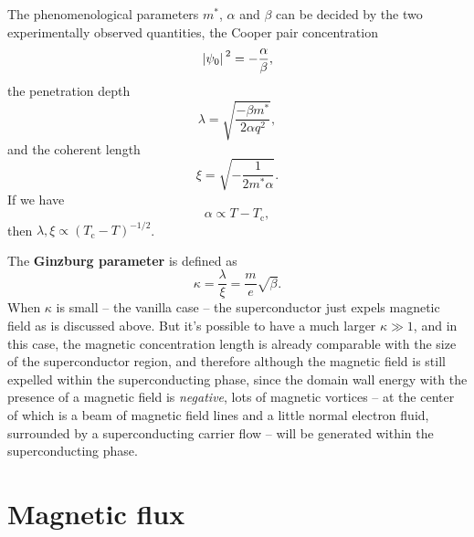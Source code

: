 \documentclass[hyperref, a4paper]{article}
\newcommand*{\concept}[1]{{\textbf{#1}}}
\newcommand*{\Tc}{T_{\text{c}}}
\begin{document}
The phenomenological parameters $m^*$, $\alpha$ and $\beta$
can be decided by the two experimentally observed quantities, 
the Cooper pair concentration 
\begin{equation}
    \abs*{\psi_0}^2 = - \frac{\alpha}{\beta},
\end{equation}
the penetration depth 
\begin{equation}
    \lambda = \sqrt{\frac{- \beta m^*}{2 \alpha q^2}},
\end{equation}
and the coherent length 
\begin{equation}
    \xi = \sqrt{- \frac{1}{2 m^* \alpha}}.
\end{equation}
If we have 
\begin{equation}
    \alpha \propto T - \Tc,
\end{equation}
then $\lambda, \xi \propto (\Tc - T)^{-1/2}$.

The \concept{Ginzburg parameter} is defined as 
\begin{equation}
    \kappa = \frac{\lambda}{\xi} = \frac{m}{e} \sqrt{\beta}.
\end{equation}
When $\kappa$ is small -- the vanilla case -- 
the superconductor just expels magnetic field 
as is discussed above.
But it's possible to have a much larger $\kappa \gg 1$, 
and in this case, 
the magnetic concentration length is already comparable 
with the size of the superconductor region, 
and therefore although the magnetic field is still expelled 
within the superconducting phase, 
since the domain wall energy with the presence of a magnetic field is \emph{negative}, 
lots of magnetic vortices -- 
at the center of which is a beam of magnetic field lines 
and a little normal electron fluid,
surrounded by a superconducting carrier flow -- 
will be generated within the superconducting phase.

\section{Magnetic flux}
\end{document}
